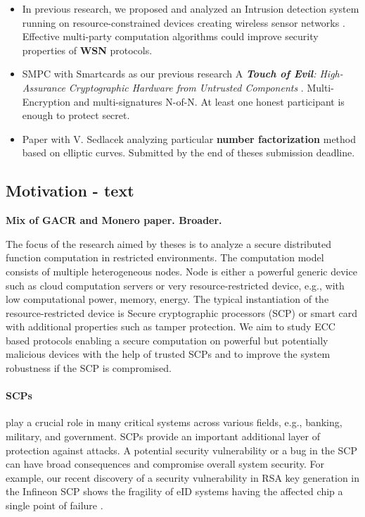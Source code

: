 \documentclass[
  digital, %
  twoside, %
  table,   %
  lof,     %
  lot,     %
]{fithesis3}
\begin{document}
\begin{ecmmnt}
\begin{itemize}
    \item In previous research, we proposed and analyzed an Intrusion detection system running on resource-constrained devices creating wireless sensor networks \cite{wsnprotectlayer}. Effective multi-party computation algorithms could improve security properties of {\bf{WSN}} protocols.
    
    \item SMPC with Smartcards as our previous research A {\it {\bf{Touch of Evil}}: High-Assurance Cryptographic Hardware from Untrusted Components} \cite{2017-ccs-mavroudis}. Multi-Encryption and multi-signatures N-of-N. At least one honest participant is enough to protect secret.
    
    \item Paper with V. Sedlacek analyzing particular {\bf{number factorization}} method based on elliptic curves. Submitted by the end of theses submission deadline.

\end{itemize}

\subsection{Motivation - text}

    {\bf{Mix of GACR and Monero paper. Broader.}}
    
    The focus of the research aimed by theses is to analyze a secure distributed function computation in restricted environments. The computation model consists of multiple heterogeneous nodes. Node is either a powerful generic device such as cloud computation servers or very resource-restricted device, e.g., with low computational power, memory, energy. The typical instantiation of the resource-restricted device is Secure cryptographic processors (SCP) or smart card with additional properties such as tamper protection. 
    We aim to study ECC based protocols enabling a secure computation on powerful but potentially malicious devices with the help of trusted SCPs and to improve the system robustness if the SCP is compromised.
    
    \paragraph{SCPs} play a crucial role in many critical systems across various fields, e.g., banking, military, and government.
    SCPs provide an important additional layer of protection against attacks. A potential security vulnerability or a bug in the SCP can have broad consequences and compromise overall system security. For example, our recent discovery of a security vulnerability in RSA key generation in the Infineon SCP shows the fragility of eID systems having the affected chip a single point of failure \cite{2017-ccs-nemec}. 
    

\end{ecmmnt}
\end{document}
